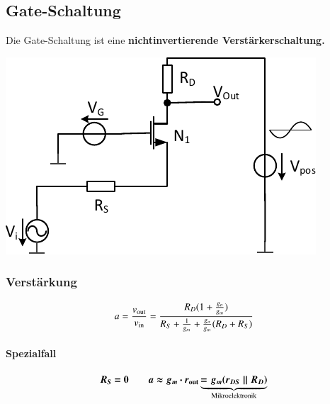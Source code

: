 \subsection{Gate-Schaltung}

Die Gate-Schaltung ist eine \textbf{nichtinvertierende Verstärkerschaltung.}

\smallskip

\begin{minipage}[t]{0.4\columnwidth}
    \includegraphics[width=\columnwidth, align=t]{images/03_gate_schaltung.pdf}
\end{minipage}
\hfill
\begin{minipage}[t]{0.58\columnwidth}
    \subsubsection{Verstärkung}

    \vspace{-0.2cm}

    \[
        a = \frac{v_{\rm out}}{v_{\rm in}} = \frac{R_D (1+\frac{g_o}{g_m})}{R_S + \frac{1}{g_m} + \frac{g_o}{g_m} (R_D + R_S)}
    \]

    \paragraph{Spezialfall}
    
    \vspace{-0.5cm}

    \[
        \bm{R_S = 0 \qquad  a \approx g_m \cdot r_{\rm out} \underbrace{= g_m (r_{DS} \parallel R_D) }_{\text{Mikroelektronik}} }
    \]
\end{minipage}

\smallskip


